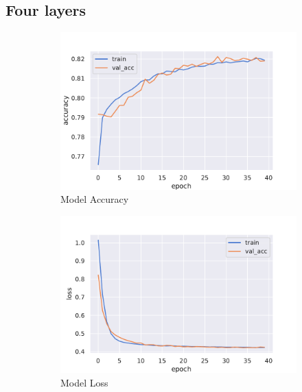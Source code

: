\subsection{Four layers}
\begin{figure}[H]
     \centering
     \begin{subfigure}[b]{0.3\textwidth}
         \centering
         \includegraphics[width=\textwidth]{figure_3/One_node_four_accuracy.pdf}
         \caption{Model Accuracy}
         \label{fig:y equals x}
     \end{subfigure}
     \hfill
     \begin{subfigure}[b]{0.3\textwidth}
         \centering
         \includegraphics[width=\textwidth]{figure_3/One_node_four_loss.pdf}
         \caption{Model Loss}
         \label{fig:three sin x}
     \end{subfigure}
     \hfill
     \begin{subfigure}[b]{0.3\textwidth}

\end{subfigure}
\end{figure}
